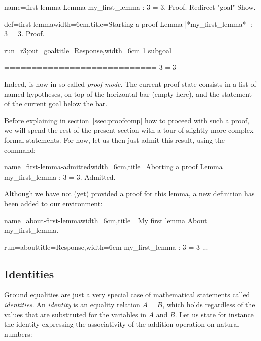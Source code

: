 \begin{coqdef}{name=first-lemma}
Lemma my_first_lemma : 3 = 3.
Proof. Redirect "goal" Show.
\end{coqdef}
\begin{coq}{def=first-lemma}{width=6cm,title=Starting a proof}
Lemma |*my_first_lemma*| : 3 = 3.
Proof.
\end{coq}
\begin{coqout}{run=r3;out=goal}{title=Response,width=6cm}
1 subgoal

  ============================
   3 = 3
\end{coqout}
Indeed, \Coq{} is now in so-called \emph{proof mode}. The
current proof state consists in a list of named hypotheses, on top of
the horizontal bar (empty here), and the statement of the current goal
below the bar.

Before explaining in section~\ref{ssec:proofcomp} how to proceed with
such a proof, we will spend the rest of the present section with
a tour of slightly more complex formal statements.
For now, let us then just admit this result, using the 
command:

\begin{coq}{name=first-lemma-admitted}{width=6cm,title=Aborting a proof}
Lemma my_first_lemma : 3 = 3.
Admitted.
\end{coq}

Although we have not (yet) provided a proof for this lemma, a new
definition has been added to our environment:

\begin{coq}{name=about-first-lemma}{width=6cm,title= My first lemma}
About my_first_lemma.
\end{coq}
\begin{coqout}{run=about}{title=Response,width=6cm}
my_first_lemma : 3 = 3
...
\end{coqout}


\subsection{Identities}\label{ssec:id}


Ground equalities are just a very special case of mathematical
statements called \emph{identities}. An \emph{identity} is an equality
relation $A = B$, which holds regardless of the values that are
substituted for the variables in $A$ and $B$.
Let us state for instance the identity expressing the associativity of
the addition operation  on natural numbers:

